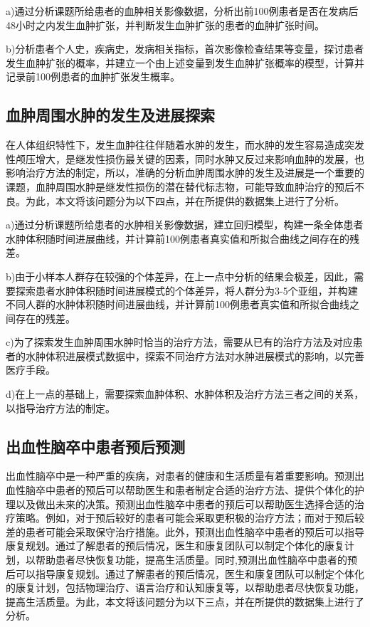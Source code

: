\documentclass[bwprint]{gmcmthesis}
\begin{document}
a)通过分析课题所给患者的血肿相关影像数据，分析出前100例患者是否在发病后48小时之内发生血肿扩张，并判断发生血肿扩张的患者的血肿扩张时间。

b)分析患者个人史，疾病史，发病相关指标，首次影像检查结果等变量，探讨患者发生血肿扩张的概率，并建立一个由上述变量到发生血肿扩张概率的模型，计算并记录前100例患者的血肿扩张发生概率。

\subsection{血肿周围水肿的发生及进展探索}

在人体组织特性下，发生血肿往往伴随着水肿的发生，而水肿的发生容易造成突发性颅压增大，是继发性损伤最关键的因素，同时水肿又反过来影响血肿的发展，也影响治疗方法的制定，所以，准确的分析血肿周围水肿的发生及进展是一个重要的课题，血肿周围水肿是继发性损伤的潜在替代标志物，可能导致血肿治疗的预后不良。为此，本文将该问题分为以下四点，并在所提供的数据集上进行了分析。

a)通过分析课题所给患者的水肿相关影像数据，建立回归模型，构建一条全体患者水肿体积随时间进展曲线，并计算前100例患者真实值和所拟合曲线之间存在的残差。

b)由于小样本人群存在较强的个体差异，在上一点中分析的结果会极差，因此，需要探索患者水肿体积随时间进展模式的个体差异，将人群分为3-5个亚组，并构建不同人群的水肿体积随时间进展曲线，并计算前100例患者真实值和所拟合曲线之间存在的残差。

c)为了探索发生血肿周围水肿时恰当的治疗方法，需要从已有的治疗方法及对应患者的水肿体积进展模式数据中，探索不同治疗方法对水肿进展模式的影响，以完善医疗手段。

d)在上一点的基础上，需要探索血肿体积、水肿体积及治疗方法三者之间的关系，以指导治疗方法的制定。

\subsection{出血性脑卒中患者预后预测}

出血性脑卒中是一种严重的疾病，对患者的健康和生活质量有着重要影响。预测出血性脑卒中患者的预后可以帮助医生和患者制定合适的治疗方法、提供个体化的护理以及做出未来的决策。预测出血性脑卒中患者的预后可以帮助医生选择合适的治疗策略。例如，对于预后较好的患者可能会采取更积极的治疗方法；而对于预后较差的患者可能会采取保守治疗措施。此外，预测出血性脑卒中患者的预后可以指导康复规划。通过了解患者的预后情况，医生和康复团队可以制定个体化的康复计划，以帮助患者尽快恢复功能，提高生活质量。同时,预测出血性脑卒中患者的预后可以指导康复规划。通过了解患者的预后情况，医生和康复团队可以制定个体化的康复计划，包括物理治疗、语言治疗和认知康复等，以帮助患者尽快恢复功能，提高生活质量。为此，本文将该问题分为以下三点，并在所提供的数据集上进行了分析。
\end{document}
